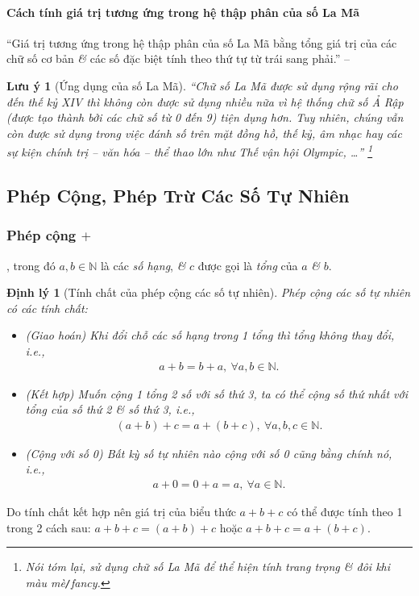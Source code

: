 \documentclass{article}
\numberwithin{equation}{section}
\newtheorem{luuy}{Lưu ý}[section]
\newtheorem{dinhly}{Định lý}[section]
\begin{document}
\paragraph{Cách tính giá trị tương ứng trong hệ thập phân của số La Mã}
``Giá trị tương ứng trong hệ thập phân của số La Mã bằng tổng giá trị của các chữ số cơ bản \textit{\&} các số đặc biệt tính theo thứ tự từ trái sang phải.'' -- \cite[p. 14]{SGK_Toan_6_Canh_Dieu_tap_1}

\begin{luuy}[Ứng dụng của số La Mã]
	``Chữ số La Mã được sử dụng rộng rãi cho đến thế kỷ XIV thì không còn được sử dụng nhiều nữa vì hệ thống chữ số Ả Rập (được tạo thành bởi các chữ số từ 0 đến 9) tiện dụng hơn. Tuy nhiên, chúng vẫn còn được sử dụng trong việc đánh số trên mặt đồng hồ, thế kỷ, âm nhạc hay các sự kiện chính trị -- văn hóa -- thể thao lớn như Thế vận hội Olympic, \ldots'' \footnote{Nói tóm lại, sử dụng chữ số La Mã để thể hiện tính trang trọng \textit{\&} đôi khi màu mè\texttt{/}fancy.}
\end{luuy}


\subsection{Phép Cộng, Phép Trừ Các Số Tự Nhiên}

\subsubsection{Phép cộng $+$}
, trong đó $a,b\in\mathbb{N}$ là các \textit{số hạng}, \textit{\&} $c$ được gọi là \textit{tổng} của $a$ \textit{\&} $b$.

\begin{dinhly}[Tính chất của phép cộng các số tự nhiên]
	Phép cộng các số tự nhiên có các tính chất:
	\begin{itemize}
		\item (Giao hoán) Khi đổi chỗ các số hạng trong 1 tổng thì tổng không thay đổi, i.e.,
		\begin{align*}
			a + b = b + a,\ \forall a,b\in\mathbb{N}.
		\end{align*}
		\item (Kết hợp) Muốn cộng 1 tổng 2 số với số thứ 3, ta có thể cộng số thứ nhất với tổng của số thứ 2 \textit{\&} số thứ 3, i.e.,
		\begin{align*}
			(a + b) + c = a +(b + c),\ \forall a,b,c\in\mathbb{N}.
		\end{align*}
		\item (Cộng với số 0) Bất kỳ số tự nhiên nào cộng với số 0 cũng bằng chính nó, i.e.,
		\begin{align*}
			a + 0 = 0 + a = a,\ \forall a\in\mathbb{N}.
		\end{align*}
	\end{itemize}
\end{dinhly}
Do tính chất kết hợp nên giá trị của biểu thức $a + b + c$ có thể được tính theo 1 trong 2 cách sau: $a + b + c = (a + b) + c$ hoặc $a + b + c = a + (b + c)$.
\end{document}
